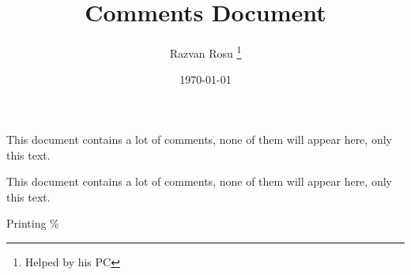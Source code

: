 \documentclass[12pt, letterpaper, twoside]{article}
\title{Comments Document}
\author{Razvan Rosu \thanks{Helped by his PC}}
\date{\today}
\begin{document}
	
	\begin{titlepage}
		\maketitle
	\end{titlepage}

	This document contains a lot of comments, none of them will appear here, only this text.
	
	This document contains a lot of comments, none of them will appear here, only this text.
	
	Printing \%
	
	\begin{comment}
		This text won't show up in the compiled pdf, this is just a multi=line comment. Useful to, for instance, comment out slow-rendering parts while working on a draft.
	\end{comment}
	
\end{document}
